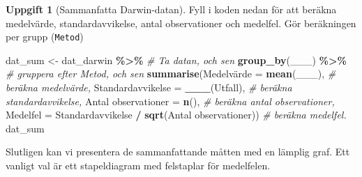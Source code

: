 \documentclass[
]{book}
\newenvironment{Shaded}{\begin{snugshade}}{\end{snugshade}}
\newcommand{\AttributeTok}[1]{\textcolor[rgb]{0.13,0.29,0.53}{#1}}
\newcommand{\CommentTok}[1]{\textcolor[rgb]{0.56,0.35,0.01}{\textit{#1}}}
\newcommand{\FunctionTok}[1]{\textcolor[rgb]{0.13,0.29,0.53}{\textbf{#1}}}
\newcommand{\NormalTok}[1]{#1}
\newcommand{\OtherTok}[1]{\textcolor[rgb]{0.56,0.35,0.01}{#1}}
\newcommand{\SpecialCharTok}[1]{\textcolor[rgb]{0.81,0.36,0.00}{\textbf{#1}}}
\newcommand{\StringTok}[1]{\textcolor[rgb]{0.31,0.60,0.02}{#1}}
\theoremstyle{definition}
\theoremstyle{definition}
\theoremstyle{definition}
\newtheorem{exercise}{Uppgift}[chapter]
\theoremstyle{definition}
\theoremstyle{remark}
\begin{document}
\begin{exercise}[Sammanfatta Darwin-datan]

Fyll i koden nedan för att beräkna medelvärde, standardavvikelse, antal observationer och medelfel. Gör beräkningen per grupp (\texttt{Metod})

\begin{Shaded}
\begin{Highlighting}[]
\NormalTok{dat\_sum }\OtherTok{\textless{}{-}}\NormalTok{ dat\_darwin }\SpecialCharTok{\%\textgreater{}\%}                                                 \CommentTok{\# Ta datan, och sen}
  \FunctionTok{group\_by}\NormalTok{(\_\_\_) }\SpecialCharTok{\%\textgreater{}\%}                                                       \CommentTok{\# gruppera efter Metod, och sen}
  \FunctionTok{summarise}\NormalTok{(Medelvärde }\OtherTok{=} \FunctionTok{mean}\NormalTok{(\_\_\_),                                       }\CommentTok{\# beräkna medelvärde,}
            \AttributeTok{Standardavvikelse =} \FunctionTok{\_\_\_}\NormalTok{(Utfall),                              }\CommentTok{\# beräkna standardavvikelse,}
            \StringTok{\textasciigrave{}}\AttributeTok{Antal observationer}\StringTok{\textasciigrave{}} \OtherTok{=} \FunctionTok{n}\NormalTok{(),                                  }\CommentTok{\# beräkna antal observationer,}
            \AttributeTok{Medelfel =}\NormalTok{ Standardavvikelse }\SpecialCharTok{/} \FunctionTok{sqrt}\NormalTok{(}\StringTok{\textasciigrave{}}\AttributeTok{Antal observationer}\StringTok{\textasciigrave{}}\NormalTok{))   }\CommentTok{\# beräkna medelfel.}
\NormalTok{dat\_sum}
\end{Highlighting}
\end{Shaded}

\end{exercise}

Slutligen kan vi presentera de sammanfattande måtten med en lämplig graf. Ett vanligt val är ett stapeldiagram med felstaplar för medelfelen.
\end{document}
